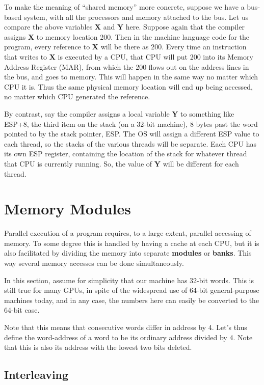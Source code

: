 To make the meaning of ``shared memory'' more concrete, suppose we have
a bus-based system, with all the processors and memory attached to the
bus. Let us compare the above variables {\bf X} and {\bf Y} here.
Suppose again that the compiler assigns {\bf X} to memory location 200.
Then in the machine language code for the program, every reference to
{\bf X} will be there as 200. Every time an instruction that writes to
{\bf X} is executed by a CPU, that CPU will put 200 into its Memory
Address Register (MAR), from which the 200 flows out on the address
lines in the bus, and goes to memory. This will happen in the same way
no matter which CPU it is. Thus the same physical memory location will
end up being accessed, no matter which CPU generated the reference.

By contrast, say the compiler assigns a local variable {\bf Y} to
something like ESP+8, the third item on the stack (on a 32-bit machine),
8 bytes past the word pointed to by the stack pointer, ESP.  The OS will
assign a different ESP value to each thread, so the stacks of the
various threads will be separate.  Each CPU has its own ESP register,
containing the location of the stack for whatever thread that CPU is
currently running.  So, the value of {\bf Y} will be different for each
thread.

\section{Memory Modules}
\label{banks}

Parallel execution of a program requires, to a large extent, parallel
accessing of memory.  To some degree this is handled by having a cache
at each CPU, but it is also facilitated by dividing the memory into
separate {\bf modules} or {\bf banks}.  This way several memory accesses
can be done simultaneously.

In this section, assume for simplicity that our machine has 32-bit
words.  This is still true for many GPUs, in spite of the widespread use
of 64-bit general-purpose machines today, and in any case, the numbers
here can easily be converted to the 64-bit case.

Note that this means that consecutive words differ in address by 4.
Let's thus define the word-address of a word to be its ordinary address
divided by 4.  Note that this is also its address with the lowest two
bits deleted.

\subsection{Interleaving}
\label{interleaving}

